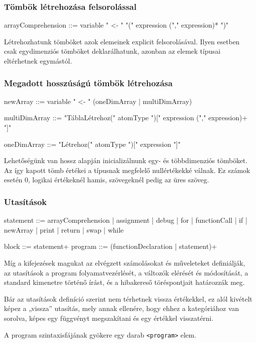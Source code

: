 \subsubsection{Tömbök létrehozása felsorolással}

\begin{ebnf}
arrayComprehension ::= variable " <- " "(" expression ("," expression)* ")"
\end{ebnf}

Létrehozhatunk tömböket azok elemeinek explicit felsorolásával. Ilyen esetben csak egydimenziós tömböket deklarálhatunk, azonban az elemek típusai eltérhetnek egymástól.

\subsubsection{Megadott hosszúságú tömbök létrehozása}

\begin{ebnf}
newArray ::= variable " <- " (oneDimArray | multiDimArray)

multiDimArray ::= 
    "TáblaLétrehoz(" atomType ")[" expression ("," expression)+ "]"

oneDimArray ::= "Létrehoz(" atomType ")[" expression "]"
\end{ebnf}

Lehetőségünk van hossz alapján inicializálnunk egy- és többdimenziós tömböket. Az így kapott tömb értékei a típusnak megfelelő nullértékekké válnak. Ez számok esetén 0, logikai értékeknél hamis, szövegeknél pedig az üres szöveg.

\subsubsection{Utasítások}

\begin{ebnf}
statement ::= arrayComprehension 
    | assignment 
    | debug 
    | for 
    | functionCall 
    | if 
    | newArray 
    | print 
    | return 
    | swap 
    | while

block ::= statement+
program ::= (functionDeclaration | statement)+
\end{ebnf}

Míg a kifejezések magukat az elvégzett számolásokat és műveleteket definiálják, az utasítások a program folyamatvezérlését, a változók elérését és módosítását, a standard kimenetre történő írást, és a hibakereső töréspontjait határozzák meg.

Bár az utasítások definíció szerint nem térhetnek vissza értékekkel, ez alól kivételt képez a „vissza” utasítás, mely annak ellenére, hogy ehhez a kategóriához van sorolva, képes egy függvényt megszakítani és egy értékkel visszatérni.

A program szintaxisfájának gyökere egy darab \texttt{<program>} elem.
